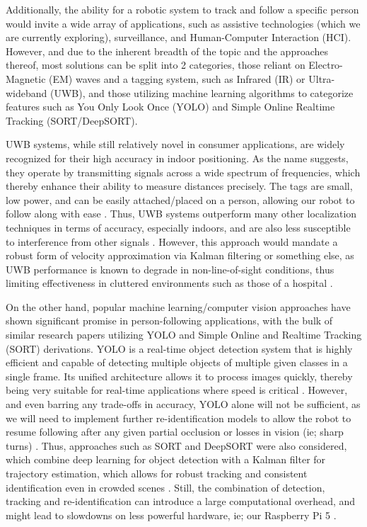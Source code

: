 \documentclass{article}
\begin{document}
Additionally, the ability for a robotic system to track and follow a specific person would invite a wide array of applications, such as assistive technologies (which we are currently exploring), surveillance, and Human-Computer Interaction (HCI). However, and due to the inherent breadth of the topic and the approaches thereof, most solutions can be split into 2 categories, those reliant on Electro-Magnetic (EM) waves and a tagging system, such as Infrared (IR) or Ultra-wideband (UWB), and those utilizing machine learning algorithms to categorize features such as You Only Look Once (YOLO) and Simple Online Realtime Tracking (SORT/DeepSORT).

UWB systems, while still relatively novel in consumer applications, are widely recognized for their high accuracy in indoor positioning. As the name suggests, they operate by transmitting signals across a wide spectrum of frequencies, which thereby enhance their ability to measure distances precisely. The tags are small, low power, and can be easily attached/placed on a person, allowing our robot to follow along with ease \cite{zhang2009uwb}. Thus, UWB systems outperform many other localization techniques in terms of accuracy, especially indoors, and are also less susceptible to interference from other signals \cite{zhang2009uwb} \cite{alarifi2016ultra}. However, this approach would mandate a robust form of velocity approximation via Kalman filtering or something else, as UWB performance is known to degrade in non-line-of-sight conditions, thus limiting effectiveness in cluttered environments such as those of a hospital \cite{alarifi2016ultra}.

On the other hand, popular machine learning/computer vision approaches have shown significant promise in person-following applications, with the bulk of similar research papers utilizing YOLO and Simple Online and Realtime Tracking (SORT) derivations. YOLO is a real-time object detection system that is highly efficient and capable of detecting multiple objects of multiple given classes in a single frame. Its unified architecture allows it to process images quickly, thereby being very suitable for real-time applications where speed is critical \cite{han2021you}. However, and even barring any trade-offs in accuracy, YOLO alone will not be sufficient, as we will need to implement further re-identification models to allow the robot to resume following after any given partial occlusion or losses in vision (ie; sharp turns) \cite{han2021you}. Thus, approaches such as SORT and DeepSORT were also considered, which combine deep learning for object detection with a Kalman filter for trajectory estimation, which allows for robust tracking and consistent identification even in crowded scenes \cite{wojke2017simple}. Still, the combination of detection, tracking and re-identification can introduce a large computational overhead, and might lead to slowdowns on less powerful hardware, ie; our Raspberry Pi 5 \cite{wojke2017simple}.
\end{document}
